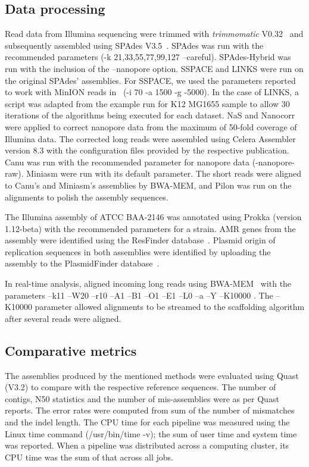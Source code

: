 \subsection{Data processing}
Read data from Illumina sequencing were trimmed with \emph{trimmomatic}
V0.32~\cite{BolgerLU2014} and subsequently assembled using SPAdes
V3.5~\cite{BankevichNA2012}. SPAdes was run with the recommended parameters (-k
21,33,55,77,99,127 --careful). SPAdes-Hybrid was run with the inclusion of the
--nanopore option. SSPACE and LINKS were run on the original SPAdes' assemblies.
For SSPACE, we used the parameters reported to work with MinION reads
in~\cite{KarlssonLS2015} (-i 70 -a 1500 -g -5000). In the case of LINKS, a script
was adapted from the example run for \ec{} K12 MG1655 sample to allow 30
iterations of the algorithms being executed for each dataset. NaS and Nanocorr
were applied to correct nanopore data from the maximum of 50-fold coverage of
Illumina data. The corrected long reads were assembled using Celera Assembler
version 8.3 with the configuration files provided by the respective publication.
Canu was run with the recommended parameter for nanopore data 
(-nanopore-raw). Miniasm were run with its default parameter. The short reads 
were aligned to Canu's and Miniasm's assemblies by BWA-MEM, and Pilon was run on 
the alignments to polish the assembly sequences.


The Illumina assembly of \kp{} ATCC BAA-2146 was annotated using 
Prokka (version 1.12-beta) with the recommended parameters for a \kp{} strain.
AMR genes from the assembly were identified using the ResFinder 
database~\cite{ZankariHC2012}.
Plasmid origin of replication sequences in both \kp{} assemblies were identified 
by uploading the assembly to the PlasmidFinder database~\cite{CarattoliZG2014}.


In real-time analysis, \npscarf{} aligned incoming long
reads using BWA-MEM~\cite{Li2013} with the parameters --k11 --W20 --r10
--A1 --B1 --O1 --E1 --L0 --a --Y --K10000 . The --K10000 parameter allowed 
alignments to be streamed to the scaffolding algorithm after several reads 
were aligned. 

\subsection{Comparative metrics}
The assemblies produced by the mentioned methods were evaluated using Quast
(V3.2) to compare with the respective reference sequences. The number of contigs,
N50 statistics and the number of mis-assemblies were as per Quast reports.
The error rates were computed from sum of the number of mismatches and the indel
length. The CPU time for each pipeline was measured using the Linux time command 
(/usr/bin/time -v); the sum of user time and system time was reported. 
When a pipeline was distributed across a computing cluster, its CPU time was the
sum of that across all jobs.


